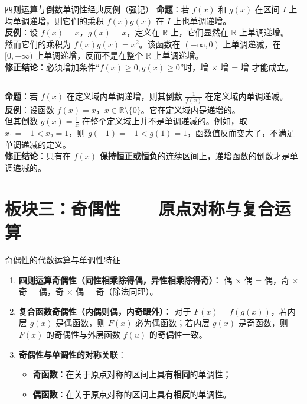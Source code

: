 \documentclass[11pt,a4paper]{ctexart}
\begin{document}
\begin{warnbox}{四则运算与倒数单调性经典反例（强记）}
  \textbf{命题}：若 $f(x)$ 和 $g(x)$ 在区间 $I$ 上均单调递增，则它们的乘积 $f(x)g(x)$ 在 $I$ 上也单调递增。\\
  \textbf{反例}：设 $f(x) = x$，$g(x) = x$，定义在 $\mathbb{R}$ 上，它们显然在 $\mathbb{R}$ 上单调递增。\\
  然而它们的乘积为 $f(x)g(x) = x^2$。该函数在 $(-\infty, 0)$ 上单调递减，在 $[0, +\infty)$ 上单调递增，反而不是在整个 $\mathbb{R}$ 上单调递增。\\
  \textbf{修正结论}：必须增加条件“$f(x) \ge 0, g(x) \ge 0$”时，增 $\times$ 增 = 增 才能成立。
  \vspace{0.4em}
  \hrule
  \vspace{0.4em}
  \textbf{命题}：若 $f(x)$ 在定义域内单调递增，则其倒数 $\frac{1}{f(x)}$ 在定义域内单调递减。\\
  \textbf{反例}：设函数 $f(x) = x$，$x \in \mathbb{R} \setminus \{0\}$。它在定义域内是递增的。\\
  但其倒数 $g(x) = \frac{1}{x}$ 在整个定义域上并不是单调递减的。例如，取 $x_1 = -1 < x_2 = 1$，则 $g(-1) = -1 < g(1) = 1$，函数值反而变大了，不满足单调递减的定义。\\
  \textbf{修正结论}：只有在 $f(x)$ \textbf{保持恒正或恒负}的连续区间上，递增函数的倒数才是单调递减的。
\end{warnbox}

\newpage

\section{板块三：奇偶性——原点对称与复合运算}

\begin{theorembox}{奇偶性的代数运算与单调性特征}
  \begin{enumerate}
    \item \textbf{四则运算奇偶性（同性相乘除得偶，异性相乘除得奇）}：
          偶 $\times$ 偶 = 偶，奇 $\times$ 奇 = 偶，奇 $\times$ 偶 = 奇（除法同理）。
    \item \textbf{复合函数奇偶性（内偶则偶，内奇跟外）}：
          对于 $F(x) = f(g(x))$，若内层 $g(x)$ 是偶函数，则 $F(x)$ 必为偶函数；若内层 $g(x)$ 是奇函数，则 $F(x)$ 的奇偶性与外层函数 $f(u)$ 的奇偶性一致。
    \item \textbf{奇偶性与单调性的对称关联}：
          \begin{itemize}
            \item \textbf{奇函数}：在关于原点对称的区间上具有\textbf{相同}的单调性；
            \item \textbf{偶函数}：在关于原点对称的区间上具有\textbf{相反}的单调性。
          \end{itemize}
  \end{enumerate}
\end{theorembox}
\end{document}
